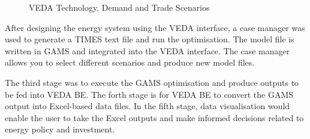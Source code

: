 \documentclass[12pt]{article}
\begin{document}
\begin{figure}[H]
	\caption{VEDA Technology, Demand and Trade Scenarios}%
	\label{fig:TDT}
\end{figure}


After designing the energy system using the VEDA interface, a case manager was used to generate a TIMES text file and 
run the optimisation. The model file is written in GAMS and integrated into the VEDA interface. 
The case manager allows you to select different scenarios and produce new model files.

The third stage was to execute the GAMS optimisation and produce outputs to be fed into VEDA BE. 
The forth stage is for VEDA BE to convert the GAMS output into Excel-based data files. 
In the fifth stage, data visualisation would enable the user to take the Excel outputs and make informed decisions related to energy policy and investment.
\end{document}
